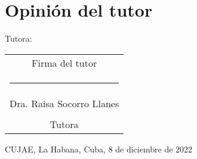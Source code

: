 \chapter*{Opinión del tutor}


\vspace{1.5cm}

Tutora:

\vspace{1.5cm}
\begingroup	
\setlength{\tabcolsep}{10pt} %
\renewcommand{\arraystretch}{0.5} %

\begin{tabular}{c}
	Firma del tutor  \\
	\noindent\rule{6cm}{0.4pt}\\
	Dra. Raisa Socorro Llanes \\
	\\
	Tutora 
\end{tabular}
\endgroup

\vspace{1.5cm}
CUJAE, La Habana, Cuba, 8 de diciembre de 2022